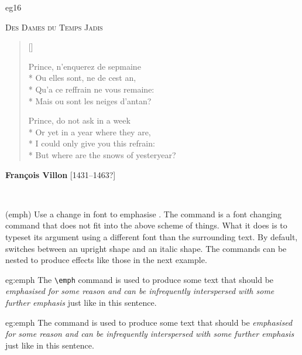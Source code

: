 \begin{egresult}{eg16}
\begin{center}
\textsc{Des Dames du Temps Jadis}
\end{center}%
\settowidth{\versewidth}{Or yet in a year where they are}
\begin{verse}[\versewidth] \begin{itshape}
Prince, n'enquerez de sepmaine \\* 
Ou elles sont, ne de cest an, \\*
Qu'a ce reffrain ne vous remaine: \\*
Mais ou sont les neiges d'antan?
\end{itshape}

Prince, do not ask in a week \\* 
Or yet in a year where they are, \\*
I could only give you this refrain: \\*
But where are the snows of yesteryear?
\end{verse}
\begin{flushright}
{\bfseries Fran\c{c}ois Villon} [1431--1463?]
\end{flushright}
\end{egresult}

\begin{syntax}
\cmd{\emph} \\
\end{syntax}
\glossary(emph)%
  {}%
  {Use a change in font to emphasise .}
The \cmd{\emph} command is a font changing command that 
does not fit
into the above scheme of things. What it does is to typeset its 
argument using a different font than the surrounding text. By default,
\cmd{\emph} switches between an upright shape and an italic shape. The
commands can be nested to produce effects like those in the next example.

\begin{egsource}{eg:emph}
The \verb?\emph? command is used to produce some text that 
should be \emph{emphasised for some reason and can be
\emph{infrequently interspersed} with some further emphasis} 
just like in this sentence.
\end{egsource}
 
\begin{egresult}{eg:emph}
The \cmd{\emph} command is used to produce some text that 
should be \emph{emphasised for some reason and can be
\emph{infrequently interspersed} with some further emphasis} 
just like in this sentence.
\end{egresult}


